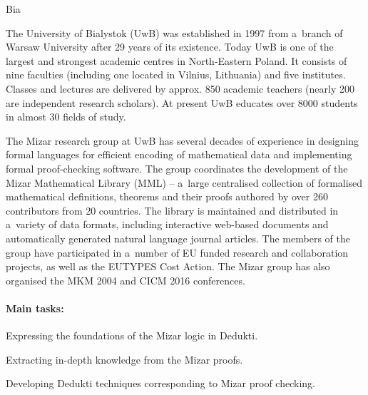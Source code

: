 \begin{sitedescription}{Bia}



The University of Bialystok (UwB) was established in 1997 from a~branch of Warsaw University after 29 years of its existence.
Today UwB is one of the largest and strongest academic centres in North-Eastern Poland.
It consists of nine faculties (including one located in Vilnius, Lithuania) and five institutes.
Classes and lectures are delivered by approx. 850 academic teachers (nearly 200 are independent research scholars).
At present UwB educates over 8000 students in almost 30 fields of study.

The Mizar research group at UwB has several decades of experience in designing formal languages 
for efficient encoding of mathematical data and implementing formal proof-checking software.
The group coordinates the development of the Mizar Mathematical Library (MML) -- 
a~large centralised collection of formalised mathematical definitions, theorems and their proofs 
authored by over 260 contributors from 20 countries.
The library is maintained and distributed in a~variety of data formats, 
including interactive web-based documents and automatically generated natural language journal articles. 
The members of the group have participated in a~number of EU funded research
and collaboration projects,
as well as the EUTYPES Cost Action.
The Mizar group has also organised the MKM 2004 and CICM 2016 conferences.

\paragraph*{Main tasks:}

\begin{compactitem}
\item Expressing the foundations of the Mizar logic in Dedukti.  
\item Extracting in-depth knowledge from the Mizar proofs.  
\item Developing Dedukti techniques corresponding to Mizar proof checking.  
\end{compactitem}


\end{sitedescription}
